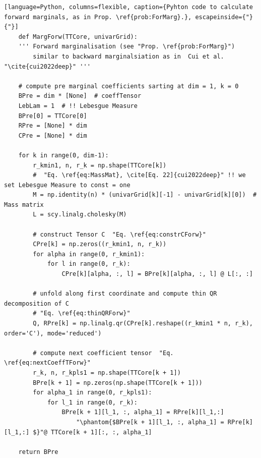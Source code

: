 \begin{lstlisting}[language=Python, columns=flexible, caption={Pyhton code to calculate forward marginals, as in Prop. \ref{prob:ForMarg}.}, escapeinside={"}{"}]
	def MargForw(TTCore, univarGrid):
	''' Forward marginalisation (see "Prop. \ref{prob:ForMarg}") 
		similar to backward marginalsiation as in  Cui et al. "\cite{cui2022deep}" '''
	
	# compute pre marginal coefficients sarting at dim = 1, k = 0
	BPre = dim * [None]  # coeffTensor
	LebLam = 1  # !! Lebesgue Measure
	BPre[0] = TTCore[0]
	RPre = [None] * dim
	CPre = [None] * dim
	
	for k in range(0, dim-1):
		r_kmin1, n, r_k = np.shape(TTCore[k])
		#  "Eq. \ref{eq:MassMat}, \cite[Eq. 22]{cui2022deep}" !! we set Lebesgue Measure to const = one
		M = np.identity(n) * (univarGrid[k][-1] - univarGrid[k][0])  # Mass matrix
		L = scy.linalg.cholesky(M)
		
		# construct Tensor C  "Eq. \ref{eq:constrCForw}"
		CPre[k] = np.zeros((r_kmin1, n, r_k))
		for alpha in range(0, r_kmin1):
			for l in range(0, r_k):
				CPre[k][alpha, :, l] = BPre[k][alpha, :, l] @ L[:, :]
		
		# unfold along first coordinate and compute thin QR decomposition of C
		# "Eq. \ref{eq:thinQRForw}"
		Q, RPre[k] = np.linalg.qr(CPre[k].reshape((r_kmin1 * n, r_k), order='C'), mode='reduced')
		
		# compute next coefficient tensor  "Eq. \ref{eq:nextCoeffTForw}"
		r_k, n, r_kpls1 = np.shape(TTCore[k + 1])
		BPre[k + 1] = np.zeros(np.shape(TTCore[k + 1]))
		for alpha_1 in range(0, r_kpls1):
			for l_1 in range(0, r_k):
				BPre[k + 1][l_1, :, alpha_1] = RPre[k][l_1,:] 
					"\phantom{$BPre[k + 1][l_1, :, alpha_1] = RPre[k][l_1,:] $}"@ TTCore[k + 1][:, :, alpha_1]
		
	return BPre
	
\end{lstlisting}


